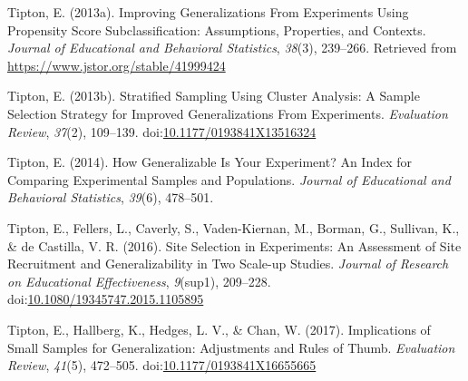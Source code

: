 \documentclass[man,floatsintext]{apa6}
\begin{document}
\leavevmode\hypertarget{ref-tiptonImprovingGeneralizationsExperiments2013}{}%
Tipton, E. (2013a). Improving Generalizations From Experiments Using Propensity Score Subclassification: Assumptions, Properties, and Contexts. \emph{Journal of Educational and Behavioral Statistics}, \emph{38}(3), 239--266. Retrieved from \url{https://www.jstor.org/stable/41999424}

\leavevmode\hypertarget{ref-tiptonStratifiedSamplingUsing2013}{}%
Tipton, E. (2013b). Stratified Sampling Using Cluster Analysis: A Sample Selection Strategy for Improved Generalizations From Experiments. \emph{Evaluation Review}, \emph{37}(2), 109--139. doi:\href{https://doi.org/10.1177/0193841X13516324}{10.1177/0193841X13516324}

\leavevmode\hypertarget{ref-tiptonHowGeneralizableYour2014}{}%
Tipton, E. (2014). How Generalizable Is Your Experiment? An Index for Comparing Experimental Samples and Populations. \emph{Journal of Educational and Behavioral Statistics}, \emph{39}(6), 478--501.

\leavevmode\hypertarget{ref-tiptonSiteSelectionExperiments2016}{}%
Tipton, E., Fellers, L., Caverly, S., Vaden-Kiernan, M., Borman, G., Sullivan, K., \& de Castilla, V. R. (2016). Site Selection in Experiments: An Assessment of Site Recruitment and Generalizability in Two Scale-up Studies. \emph{Journal of Research on Educational Effectiveness}, \emph{9}(sup1), 209--228. doi:\href{https://doi.org/10.1080/19345747.2015.1105895}{10.1080/19345747.2015.1105895}

\leavevmode\hypertarget{ref-tiptonImplicationsSmallSamples2017}{}%
Tipton, E., Hallberg, K., Hedges, L. V., \& Chan, W. (2017). Implications of Small Samples for Generalization: Adjustments and Rules of Thumb. \emph{Evaluation Review}, \emph{41}(5), 472--505. doi:\href{https://doi.org/10.1177/0193841X16655665}{10.1177/0193841X16655665}

\endgroup
\end{document}
